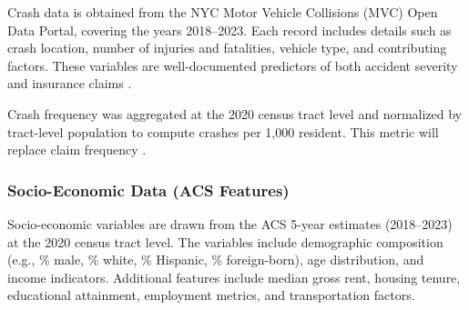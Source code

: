 \documentclass[
  number,
  review,
  3p]{elsarticle}
\begin{document}
Crash data is obtained from the NYC Motor Vehicle Collisions (MVC) Open
Data Portal, covering the years 2018--2023. Each record includes details
such as crash location, number of injuries and fatalities, vehicle type,
and contributing factors. These variables are well-documented predictors
of both accident severity and insurance claims \citep{adeniyi, dong}.

Crash frequency was aggregated at the 2020 census tract level and
normalized by tract-level population to compute crashes per 1,000
resident. This metric will replace claim frequency \citep{brubacher}.

\subsubsection{\texorpdfstring{\textbf{Socio-Economic Data (ACS
Features)}}{Socio-Economic Data (ACS Features)}}\label{socio-economic-data-acs-features}

Socio-economic variables are drawn from the ACS 5-year estimates
(2018--2023) at the 2020 census tract level. The variables include
demographic composition (e.g., \% male, \% white, \% Hispanic, \%
foreign-born), age distribution, and income indicators. Additional
features include median gross rent, housing tenure, educational
attainment, employment metrics, and transportation factors.
\end{document}
